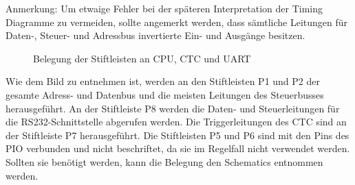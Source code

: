 \begin{warning}
    Anmerkung: Um etwaige Fehler bei der späteren Interpretation der Timing Diagramme zu vermeiden, sollte angemerkt werden, dass sämtliche Leitungen für Daten-, Steuer- und Adressbus invertierte Ein- und Ausgänge besitzen.
\end{warning}
\begin{figure}[H]
    \centering
    \qquad
    \qquad
    \qquad
    \caption[Z80 Belegung der Stiftleisten an CPU, CTC und UART]{Belegung der Stiftleisten an CPU, CTC und UART}
    \label{fig:z80-stiftleiste}
\end{figure}
Wie dem Bild zu entnehmen ist, werden an den Stiftleisten P1 und P2 der gesamte Adress- und Datenbus und die meisten Leitungen des Steuerbusses herausgeführt. An der Stiftleiste P8 werden die Daten- und Steuerleitungen für die RS232-Schnittstelle abgerufen werden. Die Triggerleitungen des CTC sind an der Stiftleiste P7 herausgeführt. Die Stiftleisten P5 und P6 sind mit den Pins des PIO verbunden und nicht beschriftet, da sie im Regelfall nicht verwendet werden. Sollten sie benötigt werden, kann die Belegung den Schematics entnommen werden.

